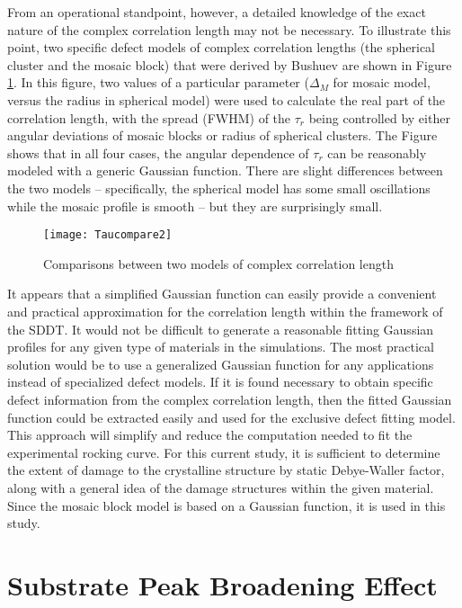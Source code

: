 From an operational standpoint, however, a detailed knowledge of the exact nature of the complex correlation length may not be necessary. To illustrate this point, two specific defect models of complex correlation lengths (the spherical cluster and the mosaic block) that were derived by Bushuev are shown in Figure \ref{taucompare}. In this figure, two values of a particular parameter ($\Delta_M$ for mosaic model, versus the radius in spherical model) were used to calculate the real part of the correlation length, with the spread (FWHM) of the $\tau_r$ being controlled by either angular deviations of mosaic blocks or radius of spherical clusters.  The Figure shows that in all four cases, the angular dependence of $\tau_r$ can be reasonably modeled with a generic Gaussian function.  There are slight differences between the two models -- specifically, the spherical model has some small oscillations while the mosaic profile is smooth -- but they are surprisingly small. 
%
\begin{figure}
	\texttt{[image: Taucompare2]}
	\caption{Comparisons between two models of complex correlation length}
	\label{taucompare}
		\end{figure}
%
It appears that a simplified Gaussian function can easily provide a convenient and practical approximation for the correlation length within the framework of the SDDT. It would not be difficult to generate a reasonable fitting Gaussian profiles for any given type of materials in the simulations.  The most practical solution would be to use a generalized Gaussian function for any applications instead of specialized defect models.  If it is found necessary to obtain specific defect information from the complex correlation length, then the fitted Gaussian function could be extracted easily and used for the exclusive defect fitting model.  This approach will simplify and reduce the computation needed to fit the experimental rocking curve.  For this current study, it is sufficient to determine the extent of damage to the crystalline structure by static Debye-Waller factor, along with a general idea of the damage structures within the given material.  Since the mosaic block model is based on a Gaussian function, it is used in this study.

	\section{Substrate Peak Broadening Effect}

